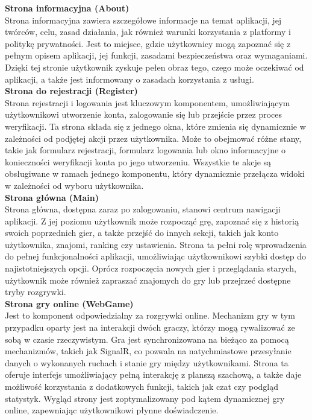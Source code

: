 \documentclass[12pt,a4paper]{article}
\begin{document}
\textbf{Strona informacyjna (About)}\\
Strona informacyjna zawiera szczegółowe informacje na temat aplikacji, jej twórców, celu, zasad działania, jak również warunki korzystania z platformy i politykę prywatności. Jest to miejsce, gdzie użytkownicy mogą zapoznać się z pełnym opisem aplikacji, jej funkcji, zasadami bezpieczeństwa oraz wymaganiami. Dzięki tej stronie użytkownik zyskuje pełen obraz tego, czego może oczekiwać od aplikacji, a także jest informowany o zasadach korzystania z usługi.
\\

\textbf{Strona do rejestracji (Register)}\\
Strona rejestracji i logowania jest kluczowym komponentem, umożliwiającym użytkownikowi utworzenie konta, zalogowanie się lub przejście przez proces weryfikacji. Ta strona składa się z jednego okna, które zmienia się dynamicznie w zależności od podjętej akcji przez użytkownika. Może to obejmować różne stany, takie jak formularz rejestracji, formularz logowania lub okno informacyjne o konieczności weryfikacji konta po jego utworzeniu. Wszystkie te akcje są obsługiwane w ramach jednego komponentu, który dynamicznie przełącza widoki w zależności od wyboru użytkownika.
\\

\textbf{Strona główna (Main)}\\
Strona główna, dostępna zaraz po zalogowaniu, stanowi centrum nawigacji aplikacji. Z jej poziomu użytkownik może rozpocząć grę, zapoznać się z historią swoich poprzednich gier, a także przejść do innych sekcji, takich jak konto użytkownika, znajomi, ranking czy ustawienia. Strona ta pełni rolę wprowadzenia do pełnej funkcjonalności aplikacji, umożliwiając użytkownikowi szybki dostęp do najistotniejszych opcji. Oprócz rozpoczęcia nowych gier i przeglądania starych, użytkownik może również zapraszać znajomych do gry lub przejrzeć dostępne tryby rozgrywki.
\\

\textbf{Strona gry online (WebGame)}\\
Jest to komponent odpowiedzialny za rozgrywki online. Mechanizm gry w tym przypadku oparty jest na interakcji dwóch graczy, którzy mogą rywalizować ze sobą w czasie rzeczywistym. Gra jest synchronizowana na bieżąco za pomocą mechanizmów, takich jak SignalR, co pozwala na natychmiastowe przesyłanie danych o wykonanych ruchach i stanie gry między użytkownikami. Strona ta oferuje interfejs umożliwiający pełną interakcję z planszą szachową, a także daje możliwość korzystania z dodatkowych funkcji, takich jak czat czy podgląd statystyk. Wygląd strony jest zoptymalizowany pod kątem dynamicznej gry online, zapewniając użytkownikowi płynne doświadczenie.
\\
\end{document}
